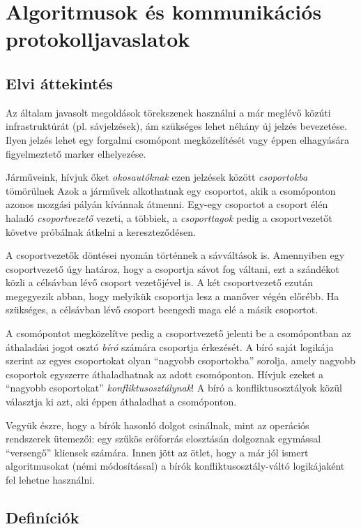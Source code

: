 \documentclass{report}
\begin{document}
	\chapter{Algoritmusok és kommunikációs protokolljavaslatok}
		\section{Elvi áttekintés}
			Az általam javasolt megoldások törekszenek használni a már meglévő közúti infrastruktúrát (pl. sávjelzések), ám szükséges lehet néhány új jelzés bevezetése. Ilyen jelzés lehet egy forgalmi csomópont megközelítését vagy éppen elhagyására figyelmeztető marker elhelyezése.
			
			Járműveink, hívjuk őket \emph{okosautóknak} ezen jelzések között \emph{csoportokba} tömörülnek Azok a járművek alkothatnak egy csoportot, akik a csomóponton azonos mozgási pályán kívánnak átmenni. Egy-egy csoportot a csoport élén haladó \emph{csoportvezető} vezeti, a többiek, a \emph{csoporttagok} pedig a csoportvezetőt követve próbálnak átkelni a kereszteződésen.
			
			A csoportvezetők döntései nyomán történnek a sávváltások is. Amennyiben egy csoportvezető úgy határoz, hogy a csoportja sávot fog váltani, ezt a szándékot közli a célsávban lévő csoport vezetőjével is. A két csoportvezető ezután megegyezik abban, hogy melyikük csoportja lesz a manőver végén előrébb. Ha szükséges, a célsávban lévő csoport beengedi maga elé a másik csoportot. 
		
			A csomópontot megközelítve pedig a csoportvezető jelenti be a csomópontban az áthaladási jogot osztó \emph{bíró} számára csoportja érkezését. A bíró saját logikája szerint az egyes csoportokat olyan ``nagyobb csoportokba'' sorolja, amely nagyobb csoportok egyszerre áthaladhatnak az adott csomóponton. Hívjuk ezeket a ``nagyobb csoportokat'' \emph{konfliktusosztálynak}! A bíró a konfliktusosztályok közül választja ki azt, aki éppen áthaladhat a csomóponton.
			
			Vegyük észre, hogy a bírók hasonló dolgot csinálnak, mint az operációs rendszerek ütemezői: egy szűkös erőforrás elosztásán dolgoznak egymással ``versengő'' kliensek számára. Innen jött az ötlet, hogy a már jól ismert algoritmusokat (némi módosítással) a bírók konfliktusosztály-váltó logikájaként fel lehetne használni.
			
		\section{Definíciók}
\end{document}
